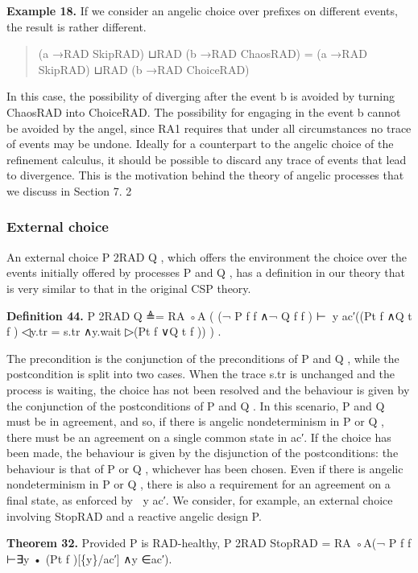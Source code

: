 \documentclass[11pt]{article}
\begin{document}
\noindent\textbf{Example 18.} If we consider an angelic choice over prefixes on different events, the result is rather different.


\begin{quote}\small\raggedright
(a →RAD SkipRAD) ⊔RAD (b →RAD ChaosRAD) = (a →RAD SkipRAD) ⊔RAD (b →RAD ChoiceRAD)
\end{quote}

In this case, the possibility of diverging after the event b is avoided by turning ChaosRAD into ChoiceRAD. The possibility for engaging in the event b cannot be avoided by the angel, since RA1 requires that under all circumstances no trace of events may be undone. Ideally for a counterpart to the angelic choice of the refinement calculus, it should be possible to discard any trace of events that lead to divergence. This is the motivation behind the theory of angelic processes that we discuss in Section 7. 2

\subsubsection{External choice}
An external choice P 2RAD Q , which offers the environment the choice over the events initially offered by processes P and Q , has a definition in our theory that is very similar to that in the original CSP theory.

\noindent\textbf{Definition 44.} P 2RAD Q ≜= RA ◦A ( (¬ P f f ∧¬ Q f f ) ⊢∈⃝y ac′((Pt f ∧Q t f ) ◁y.tr = s.tr ∧y.wait ▷(Pt f ∨Q t f )) ) .


The precondition is the conjunction of the preconditions of P and Q , while the postcondition is split into two cases. When the trace s.tr is unchanged and the process is waiting, the choice has not been resolved and the behaviour is given by the conjunction of the postconditions of P and Q . In this scenario, P and Q must be in agreement, and so, if there is angelic nondeterminism in P or Q , there must be an agreement on a single common state in ac′. If the choice has been made, the behaviour is given by the disjunction of the postconditions: the behaviour is that of P or Q , whichever has been chosen. Even if there is angelic nondeterminism in P or Q , there is also a requirement for an agreement on a final state, as enforced by ∈⃝y ac′. We consider, for example, an external choice involving StopRAD and a reactive angelic design P.

\noindent\textbf{Theorem 32.} Provided P is RAD-healthy, P 2RAD StopRAD = RA ◦A(¬ P f f ⊢∃y • (Pt f )[\{y\}/ac′] ∧y ∈ac′).
\end{document}
